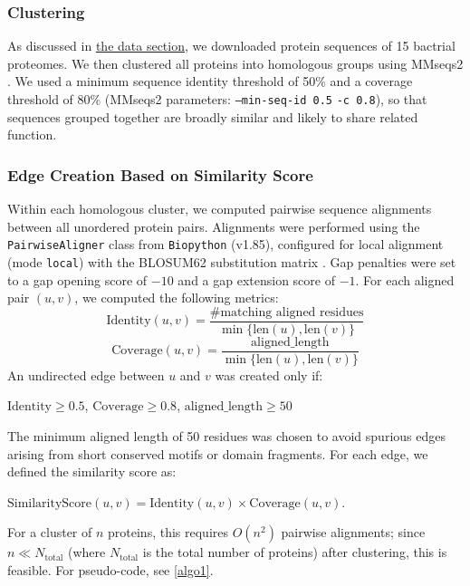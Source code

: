 \documentclass[11pt]{article}
\begin{document}
	\subsubsection{Clustering}
	As discussed in \hyperref[sec:data]{the data section}, we downloaded protein sequences of 15 bactrial proteomes. We then clustered all proteins into homologous groups using MMseqs2 \cite{Steinegger2017MMseqs2}. We used a minimum sequence identity threshold of 50\% and a coverage threshold of 80\% (MMseqs2 parameters: \texttt{--min-seq-id 0.5} \texttt{-c 0.8}), so that sequences grouped together are broadly similar and likely to share related function.
	
	\subsubsection[step 2]{Edge Creation Based on Similarity Score}
	\label{subsubsec:step2}
	Within each homologous cluster, we computed pairwise sequence alignments between all unordered protein pairs. Alignments were performed using the \texttt{PairwiseAligner} class from \texttt{Biopython} (v1.85), configured for local alignment (mode \texttt{local}) with the BLOSUM62 substitution matrix \cite{BLOSUM}. Gap penalties were set to a gap opening score of $-10$ and a gap extension score of $-1$.
	For each aligned pair $(u,v)$, we computed the following metrics:\\
	\begin{equation*}
	\text{Identity}(u,v) =
	\frac{\#\text{matching aligned residues}}
	{\min\{\text{len}(u), \text{len}(v)\}}
	\end{equation*}
	\begin{equation*}
	\text{Coverage}(u,v) =
	\frac{\text{aligned\_length}}
	{\min\{\text{len}(u), \text{len}(v)\}}
	\end{equation*}
	An undirected edge between $u$ and $v$ was created only if:
	\begin{center}
		$\text{Identity} \ge 0.5$, \quad
		$\text{Coverage} \ge 0.8$, \quad
		$\text{aligned\_length} \ge 50$
	\end{center}
	The minimum aligned length of 50 residues was chosen to avoid spurious edges arising from short conserved motifs or domain fragments. For each edge, we defined the similarity score as:
	\begin{center}
		$\text{SimilarityScore}(u,v) = \text{Identity}(u,v) \times \text{Coverage}(u,v).$
	\end{center}
	For a cluster of $n$ proteins, this requires $O(n^2)$ pairwise alignments; since $n \ll N_{\text{total}}$ (where $N_{\text{total}}$ is the total number of proteins) after clustering, this is feasible. For pseudo-code, see \cref{algo1}.
\end{document}
